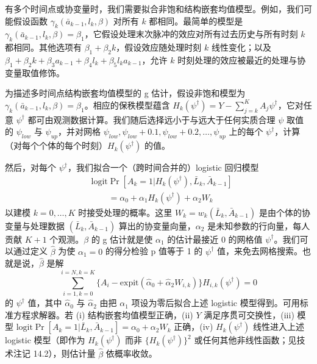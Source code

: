 {\setlength{\emergencystretch}{1.5em}
有多个时间点或协变量时，我们需要拟合非饱和结构嵌套均值模型。例如，我们可能假设函数 $\gamma_k(\bar a_{k-1},l_k,\beta)$ 对所有 $k$ 都相同。最简单的模型是 $\gamma_k(\bar a_{k-1},l_k,\beta)=\beta_1$，它假设处理末次脉冲的效应对所有过去历史与所有时刻 $k$ 都相同。其他选项有 $\beta_1+\beta_2k$，假设效应随处理时刻 $k$ 线性变化；以及 $\beta_1+\beta_2k+\beta_3a_{k-1}+\beta_4l_k+\beta_5l_ka_{k-1}$，允许 $k$ 时刻处理的效应被最近的处理与协变量取值修饰。\par}

{\setlength{\emergencystretch}{3em}
为描述多时间点结构嵌套均值模型的 g 估计，假设非饱和模型为 $\gamma_k(\bar a_{k-1},l_k,\beta)=\beta_1$。\allowbreak 相应的保秩模型蕴含 $H_k(\psi^\dagger)=Y-\sum_{j=k}^{K}A_j\psi^\dagger$，\allowbreak 它对任意 $\psi^\dagger$ 都可由观测数据计算。我们随后选择远小于与远大于任何实质合理 $\psi$ 取值的 $\psi_{low}$ 与 $\psi_{up}$，并对网格 $\psi_{low},\psi_{low}+0.1,\psi_{low}+0.2,\dots,\psi_{up}$ 上的每个 $\psi^\dagger$，计算（对每个个体的每个时刻）$H_k(\psi^\dagger)$ 的值。\par}

然后，对每个 $\psi^\dagger$，我们拟合一个（跨时间合并的）logistic 回归模型
\[
\begin{aligned}
&\mathrm{logit}\Pr[A_k=1|H_k(\psi^\dagger),\bar L_k,\bar A_{k-1}]\\
&\qquad=\alpha_0+\alpha_1H_k(\psi^\dagger)+\alpha_2W_k
\end{aligned}
\]
以建模 $k=0,\dots,K$ 时接受处理的概率。这里 $W_k=w_k(\bar L_k,\bar A_{k-1})$ 是由个体的协变量与处理数据 $(\bar L_k,\bar A_{k-1})$ 算出的协变量向量，$\alpha_2$ 是未知参数的行向量，每人贡献 $K+1$ 个观测。$\beta$ 的 g 估计就是使 $\alpha_1$ 的估计最接近 0 的网格值 $\psi^\dagger$。我们可以通过定义 $\hat\beta$ 为使 $\alpha_1=0$ 的得分检验 p 值等于 1 的 $\psi^\dagger$ 值，来免去网格搜索。也就是说，$\hat\beta$ 是解
\[
\sum_{i=1,k=0}^{i=N,k=K}\{A_i-\mathrm{expit}(\hat\alpha_0+\hat\alpha_2W_{i,k})\}H_{i,k}(\psi^\dagger)=0
\]
的 $\psi^\dagger$ 值，其中 $\hat\alpha_0$ 与 $\hat\alpha_2$ 由把 $\alpha_1$ 项设为零后拟合上述 logistic 模型得到。可用标准方程求解器。若 (i) 结构嵌套均值模型正确，(ii) $Y$ 满足序贯可交换性，(iii) 模型 $\mathrm{logit}\Pr[A_k=1|\bar L_k,\bar A_{k-1}]=\alpha_0+\alpha_2W_k$ 正确，(iv) $H_k(\psi^\dagger)$ 线性进入上述 logistic 模型（即作为 $H_k(\psi^\dagger)$ 而非 $\{H_k(\psi^\dagger)\}^2$ 或任何其他非线性函数；见技术注记 14.2），则估计量 $\hat\beta$ 依概率收敛。


